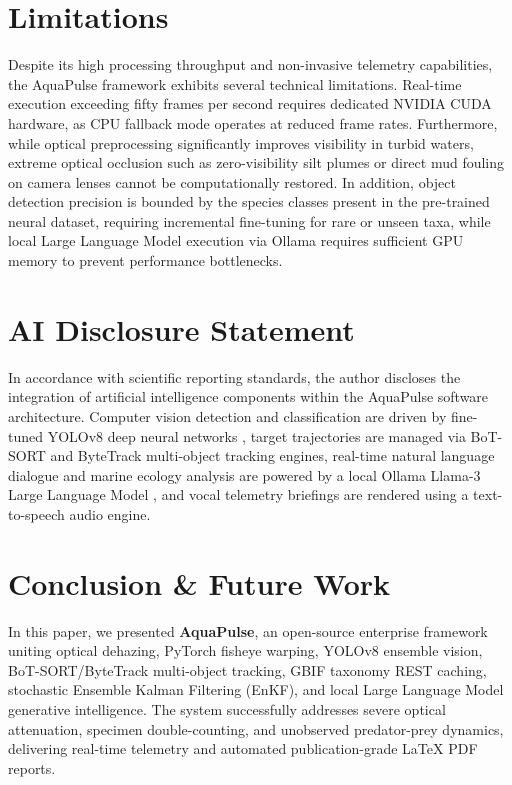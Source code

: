 \documentclass[11pt,a4paper]{article}
\newcommand{\citeblue}[1]{\cite{#1}}
\begin{document}
\section{Limitations}
Despite its high processing throughput and non-invasive telemetry capabilities, the AquaPulse framework exhibits several technical limitations. Real-time execution exceeding fifty frames per second requires dedicated NVIDIA CUDA hardware, as CPU fallback mode operates at reduced frame rates. Furthermore, while optical preprocessing significantly improves visibility in turbid waters, extreme optical occlusion such as zero-visibility silt plumes or direct mud fouling on camera lenses cannot be computationally restored. In addition, object detection precision is bounded by the species classes present in the pre-trained neural dataset, requiring incremental fine-tuning for rare or unseen taxa, while local Large Language Model execution via Ollama requires sufficient GPU memory to prevent performance bottlenecks.

\section{AI Disclosure Statement}
In accordance with scientific reporting standards, the author discloses the integration of artificial intelligence components within the AquaPulse software architecture. Computer vision detection and classification are driven by fine-tuned YOLOv8 deep neural networks \citeblue{jocher2023ultralytics}, target trajectories are managed via BoT-SORT \citeblue{aharon2022botsort} and ByteTrack \citeblue{zhang2022bytetrack} multi-object tracking engines, real-time natural language dialogue and marine ecology analysis are powered by a local Ollama Llama-3 Large Language Model \citeblue{touvron2023llama, dubey2024llama3}, and vocal telemetry briefings are rendered using a text-to-speech audio engine.

\section{Conclusion \& Future Work}
In this paper, we presented \textbf{AquaPulse}, an open-source enterprise framework uniting optical dehazing, PyTorch fisheye warping, YOLOv8 ensemble vision, BoT-SORT/ByteTrack multi-object tracking, GBIF taxonomy REST caching, stochastic Ensemble Kalman Filtering (EnKF), and local Large Language Model generative intelligence. The system successfully addresses severe optical attenuation, specimen double-counting, and unobserved predator-prey dynamics, delivering real-time telemetry and automated publication-grade LaTeX PDF reports.
\end{document}
